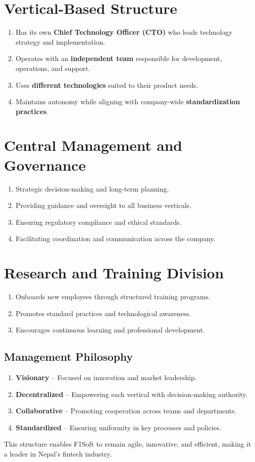 \documentclass[12pt, a4paper]{report}
\begin{document}
\section{Vertical-Based Structure}
\begin{enumerate}
    \item Has its own \textbf{Chief Technology Officer (CTO)} who leads technology strategy and implementation.
    \item Operates with an \textbf{independent team} responsible for development, operations, and support.
    \item Uses \textbf{different technologies} suited to their product needs.
    \item Maintains autonomy while aligning with company-wide \textbf{standardization practices}.
\end{enumerate}
\vspace{18pt}
\section{Central Management and Governance}
\begin{enumerate}
    \item Strategic decision-making and long-term planning.
    \item Providing guidance and oversight to all business verticals.
    \item Ensuring regulatory compliance and ethical standards.
    \item Facilitating coordination and communication across the company.
\end{enumerate}
\vspace{18pt}
\section{Research and Training Division}
\begin{enumerate}
    \item Onboards new employees through structured training programs.
    \item Promotes standard practices and technological awareness.
    \item Encourages continuous learning and professional development.
\end{enumerate}
\pagebreak
\subsection{Management Philosophy}
\begin{enumerate}
    \item \textbf{Visionary} – Focused on innovation and market leadership.
    \item \textbf{Decentralized} – Empowering each vertical with decision-making authority.
    \item \textbf{Collaborative} – Promoting cooperation across teams and departments.
    \item \textbf{Standardized} – Ensuring uniformity in key processes and policies.
\end{enumerate}
This structure enables F1Soft to remain agile, innovative, and efficient, making it a leader in Nepal’s fintech industry.
\end{document}
